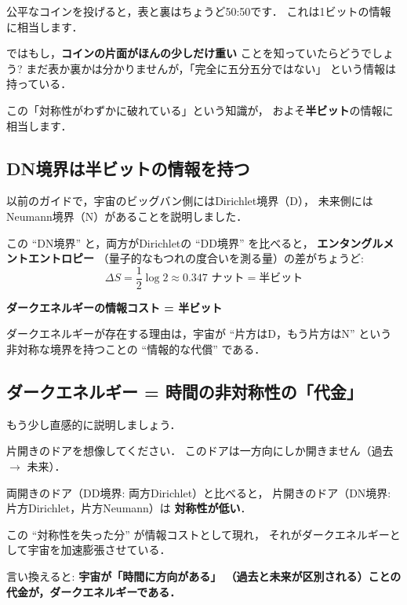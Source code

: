 \documentclass[11pt,a4paper]{article}
\begin{document}
\begin{tcolorbox}[colback=purple!5,colframe=purple!50!black,title=半ビットのたとえ]
公平なコインを投げると，表と裏はちょうど50:50です．
これは1ビットの情報に相当します．

ではもし，\textbf{コインの片面がほんの少しだけ重い}
ことを知っていたらどうでしょう?
まだ表か裏かは分かりませんが，「完全に五分五分ではない」
という情報は持っている．

この「対称性がわずかに破れている」という知識が，
およそ\textbf{半ビット}の情報に相当します．
\end{tcolorbox}

\subsection{DN境界は半ビットの情報を持つ}

以前のガイドで，宇宙のビッグバン側にはDirichlet境界（D），
未来側にはNeumann境界（N）があることを説明しました．

この ``DN境界'' と，両方がDirichletの ``DD境界'' を比べると，
\textbf{エンタングルメントエントロピー}
（量子的なもつれの度合いを測る量）の差がちょうど:
\begin{equation*}
\Delta S = \frac{1}{2}\log 2 \approx 0.347 \text{ ナット}
= \textbf{半ビット}
\end{equation*}

\begin{tcolorbox}[colback=blue!5,colframe=blue!50!black,title=重要な結果]
\textbf{ダークエネルギーの情報コスト = 半ビット}

ダークエネルギーが存在する理由は，宇宙が ``片方はD，もう片方はN''
という非対称な境界を持つことの ``情報的な代償'' である．
\end{tcolorbox}

\subsection{ダークエネルギー = 時間の非対称性の「代金」}

もう少し直感的に説明しましょう．

\begin{tcolorbox}[colback=orange!5,colframe=orange!50!black,title=ドアのたとえ]
片開きのドアを想像してください．
このドアは一方向にしか開きません（過去 $\to$ 未来）．

両開きのドア（DD境界: 両方Dirichlet）と比べると，
片開きのドア（DN境界: 片方Dirichlet，片方Neumann）は
\textbf{対称性が低い}．

この ``対称性を失った分'' が情報コストとして現れ，
それがダークエネルギーとして宇宙を加速膨張させている．

言い換えると: \textbf{宇宙が「時間に方向がある」
（過去と未来が区別される）ことの代金が，ダークエネルギーである．}
\end{tcolorbox}
\end{document}
